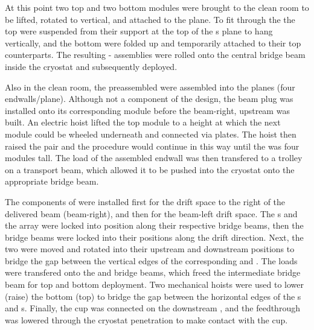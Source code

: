 At this point two top and two bottom  modules were brought to the clean room to be lifted, rotated to vertical, and attached to the  plane. 
To fit through the  the top  were suspended from their support at the top of the s plane to hang vertically, and the bottom  were folded up and temporarily attached to their top  counterparts.
The resulting - assemblies were rolled onto the central bridge beam inside the cryostat and subsequently deployed. 

Also in the  clean room, the preassembled  %
were assembled into the  planes (four endwalls/plane). %
Although not a component of the  design, 
the beam plug was installed onto its corresponding module %
before the beam-right, upstream  was built.
An electric hoist lifted the top %
module to a height at which the next %
module could be wheeled underneath and connected via  plates.
The hoist then raised the pair and the procedure would continue in this way until the  was four %
modules tall.
The load of the assembled endwall was then transfered to a trolley on a transport beam, which allowed it to be pushed into the cryostat onto the appropriate bridge beam.

The  components of  were installed first for the drift space to the right of the delivered beam (beam-right), and then for the beam-left drift space.
The s and the  array were locked into position along their respective bridge beams, then the bridge beams were locked into their positions along the drift direction.
Next, the two  were moved and rotated into their upstream and downstream positions to bridge the gap between the vertical edges of the corresponding  and .
The  loads were transfered onto the  and   bridge beams, which freed the intermediate bridge beam for top and bottom  deployment.
Two mechanical hoists were used to lower (raise) the bottom (top)  to bridge the gap between the horizontal edges of the s and s.
Finally, the  cup was connected on the downstream , and the  feedthrough was lowered through the cryostat penetration to make contact with the cup.

